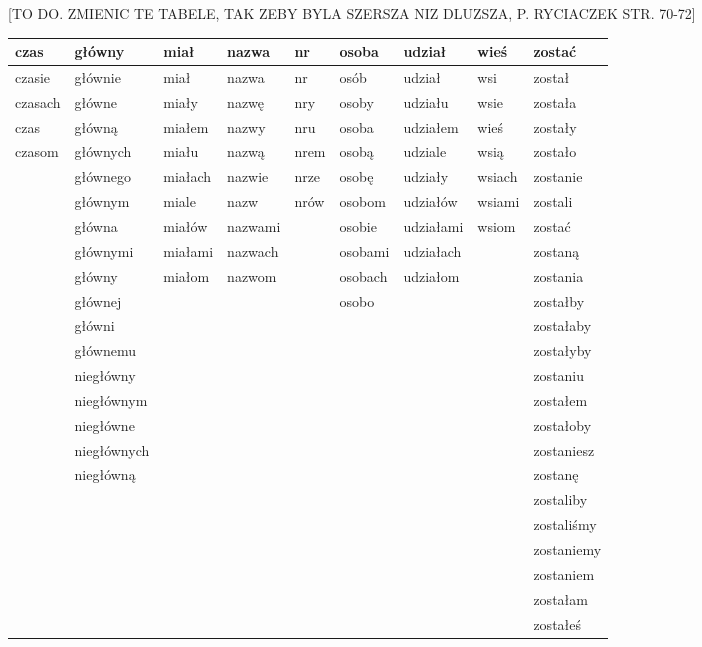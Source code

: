 \documentclass{praca1}
\begin{document}
[TO DO. ZMIENIC TE TABELE, TAK ZEBY BYLA SZERSZA NIZ DLUZSZA, P. RYCIACZEK STR. 70-72]
\begin{table}[!h]
\centering
\begin{tabular}{|lllllllll|}
  \hline
czas & główny & miał & nazwa & nr & osoba & udział & wieś & zostać \\ 
  \hline \hline
czasie & głównie & miał & nazwa & nr & osób & udział & wsi & został \\ 
  czasach & główne & miały & nazwę & nry & osoby & udziału & wsie & została \\ 
  czas & główną & miałem & nazwy & nru & osoba & udziałem & wieś & zostały \\ 
  czasom & głównych & miału & nazwą & nrem & osobą & udziale & wsią & zostało \\ 
   & głównego & miałach & nazwie & nrze & osobę & udziały & wsiach & zostanie \\ 
   & głównym & miale & nazw & nrów & osobom & udziałów & wsiami & zostali \\ 
   & główna & miałów & nazwami &  & osobie & udziałami & wsiom & zostać \\ 
   & głównymi & miałami & nazwach &  & osobami & udziałach &  & zostaną \\ 
   & główny & miałom & nazwom &  & osobach & udziałom &  & zostania \\ 
   & głównej &  &  &  & osobo &  &  & zostałby \\ 
   & główni &  &  &  &  &  &  & zostałaby \\ 
   & głównemu &  &  &  &  &  &  & zostałyby \\ 
   & niegłówny &  &  &  &  &  &  & zostaniu \\ 
   & niegłównym &  &  &  &  &  &  & zostałem \\ 
   & niegłówne &  &  &  &  &  &  & zostałoby \\ 
   & niegłównych &  &  &  &  &  &  & zostaniesz \\ 
   & niegłówną &  &  &  &  &  &  & zostanę \\ 
   &  &  &  &  &  &  &  & zostaliby \\ 
   &  &  &  &  &  &  &  & zostaliśmy \\ 
   &  &  &  &  &  &  &  & zostaniemy \\ 
   &  &  &  &  &  &  &  & zostaniem \\ 
   &  &  &  &  &  &  &  & zostałam \\ 
   &  &  &  &  &  &  &  & zostałeś \\ 

\end{tabular}
\end{table}
\end{document}
